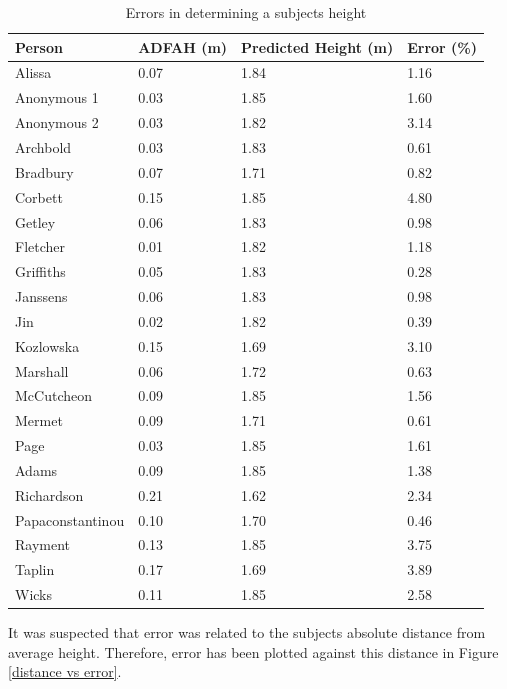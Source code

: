 \begin{table}[!htb]
\begin{center}
  \begin{tabular}{| l | p{2.5cm} | p{2cm} | p{2cm} |}
    \hline
    Person & ADFAH (m) & Predicted Height (m) & Error (\%) \\ \hline
    Alissa & 0.07 & 1.84 & 1.16\\ \hline
    Anonymous 1 & 0.03 & 1.85 & 1.60\\ \hline
    Anonymous 2	& 0.03 & 1.82 & 3.14\\ \hline
    Archbold & 0.03 & 1.83 & 0.61\\ \hline
    Bradbury & 0.07 & 1.71 & 0.82\\ \hline
    Corbett	& 0.15 & 1.85 & 4.80\\ \hline
    Getley & 0.06 & 1.83 & 0.98\\ \hline
    Fletcher & 0.01 & 1.82 & 1.18\\ \hline
    Griffiths & 0.05 & 1.83 & 0.28\\ \hline
    Janssens & 0.06 & 1.83 & 0.98\\ \hline
    Jin & 0.02 & 1.82 & 0.39\\ \hline
    Kozlowska & 0.15 & 1.69 & 3.10\\ \hline
    Marshall & 0.06 & 1.72 & 0.63\\ \hline
    McCutcheon & 0.09 & 1.85 & 1.56\\ \hline
    Mermet & 0.09 & 1.71 & 0.61\\ \hline
    Page & 0.03 & 1.85 & 1.61\\ \hline
    Adams & 0.09 & 1.85 & 1.38\\ \hline
    Richardson & 0.21 & 1.62 & 2.34\\ \hline
    Papaconstantinou & 0.10 & 1.70 & 0.46\\ \hline
    Rayment & 0.13 & 1.85 & 3.75\\ \hline
    Taplin & 0.17 & 1.69 & 3.89\\ \hline
    Wicks & 0.11 & 1.85 & 2.58\\ \hline
  \end{tabular}
\end{center}
\caption{Errors in determining a subjects height}
\label{errors in determining a subjects height}
\end{table}

It was suspected that error was related to the subjects absolute distance from average height. Therefore, error has been plotted against this distance in Figure \ref{distance vs error}.\\

